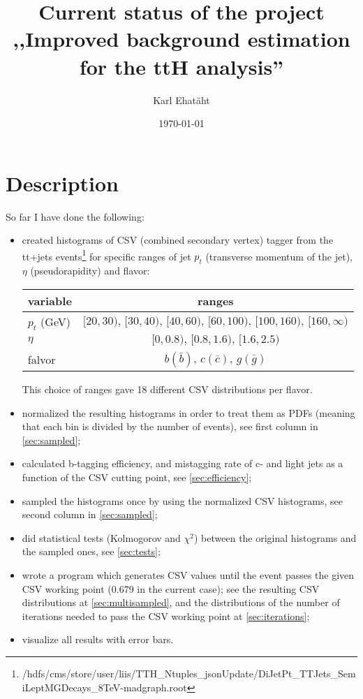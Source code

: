 \documentclass[12pt,a4paper]{article}
\title{\TitleFont\textbf{Current status of the project\\
,,Improved background estimation for the ttH analysis''}}
\author{Karl Ehatäht}
\date\today
\begin{document}
\maketitle

\section{Description}

So far I have done the following:
\begin{itemize}
\item created histograms of CSV (combined secondary vertex) tagger from the tt+jets events\footnote{/hdfs/cms/store/user/liis/TTH\_Ntuples\_jsonUpdate/DiJetPt\_TTJets\_SemiLeptMGDecays\_8TeV-madgraph.root} for specific ranges of jet $p_t$ (transverse momentum of the jet), $\eta$ (pseudorapidity) and flavor:
\begin{center}
	\begin{tabular}{ l | c }
		\hline
		variable & ranges \\ \hline
		$p_t$ (GeV) & $[20,30),\,[30,40),\,[40,60),\,[60,100),\,[100,160),\,[160,\infty)$ \\ \hline
		$\eta$ & $[0,0.8),\,[0.8,1.6),\,[1.6,2.5)$ \\ \hline
		falvor & $b(\bar{b})$, $c(\bar{c})$, $g(\bar{g})$ \\
	\end{tabular}
\end{center}
This choice of ranges gave 18 different CSV distributions per flavor.
\item normalized the resulting histograms in order to treat them as PDFs (meaning that each bin is divided by the number of events), see first column in \ref{sec:sampled};
\item calculated b-tagging efficiency, and mistagging rate of c- and light jets as a function of the CSV cutting point, see \ref{sec:efficiency};
\item sampled the histograms once by using the normalized CSV histograms, see second column in \ref{sec:sampled};
\item did statistical tests (Kolmogorov and $\chi^2$) between the original histograms and the sampled ones, see \ref{sec:tests};
\item wrote a program which generates CSV values until the event passes the given CSV working point (0.679 in the current case); see the resulting CSV distributions at \ref{sec:multisampled}, and the distributions of the number of iterations needed to pass the CSV working point at \ref{sec:iterations};
\item visualize all results with error bars.
\end{itemize}
\end{document}
